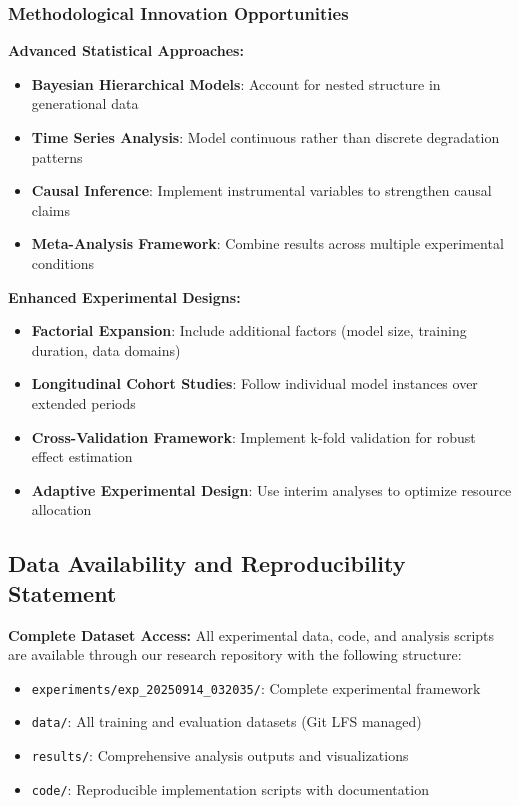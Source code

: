 \documentclass{article}
\begin{document}
\subsubsection{Methodological Innovation Opportunities}

\textbf{Advanced Statistical Approaches:}
\begin{itemize}
    \item \textbf{Bayesian Hierarchical Models}: Account for nested structure in generational data
    \item \textbf{Time Series Analysis}: Model continuous rather than discrete degradation patterns
    \item \textbf{Causal Inference}: Implement instrumental variables to strengthen causal claims
    \item \textbf{Meta-Analysis Framework}: Combine results across multiple experimental conditions
\end{itemize}

\textbf{Enhanced Experimental Designs:}
\begin{itemize}
    \item \textbf{Factorial Expansion}: Include additional factors (model size, training duration, data domains)
    \item \textbf{Longitudinal Cohort Studies}: Follow individual model instances over extended periods
    \item \textbf{Cross-Validation Framework}: Implement k-fold validation for robust effect estimation
    \item \textbf{Adaptive Experimental Design}: Use interim analyses to optimize resource allocation
\end{itemize}

\subsection{Data Availability and Reproducibility Statement}
\label{appendix:data_availability}

\textbf{Complete Dataset Access:}
All experimental data, code, and analysis scripts are available through our research repository with the following structure:
\begin{itemize}
    \item \texttt{experiments/exp\_20250914\_032035/}: Complete experimental framework
    \item \texttt{data/}: All training and evaluation datasets (Git LFS managed)
    \item \texttt{results/}: Comprehensive analysis outputs and visualizations
    \item \texttt{code/}: Reproducible implementation scripts with documentation
\end{itemize}
\end{document}
